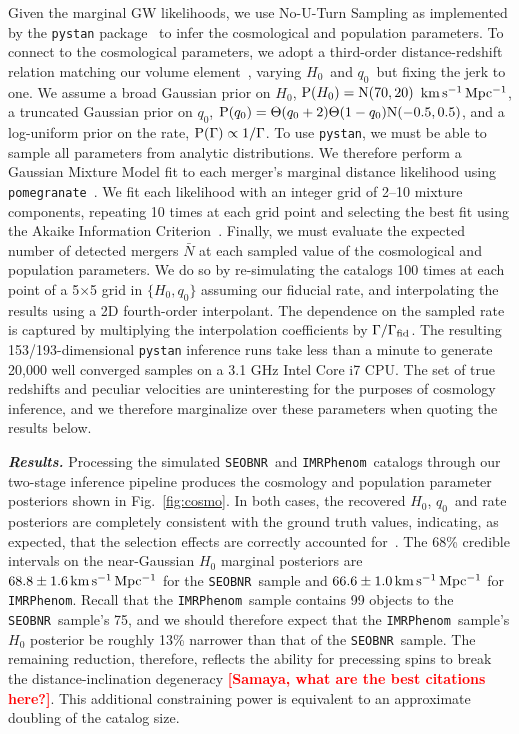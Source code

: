 \documentclass[%
 reprint,
 superscriptaddress,
 nofootinbib,
 amsmath,amssymb,
 aps,
]{revtex4-2}
\newcommand{\hubble}{\ensuremath{H_0}}
\newcommand{\decel}{\ensuremath{q_0}}
\newcommand{\prob}{\ensuremath{{\rm P}}}
\newcommand{\normal}{{\rm{N}}}
\newcommand{\nexp}{\bar{N}}
\newcommand{\rate}{\Gamma}
\newcommand{\step}{\Theta}
\newcommand{\kmsmpc}{\ensuremath{{\rm km\,s^{-1}\,Mpc^{-1}}}}
\newcommand{\seobnr}{\texttt{SEOBNR}}
\newcommand{\imrp}{\texttt{IMRPhenom}}
\newcommand{\smf}[1]{\textcolor{red}{\bf [#1]}}
\begin{document}
Given the marginal GW likelihoods, we use No-U-Turn Sampling as implemented by the \texttt{pystan} package~\cite{pystan} to infer the cosmological and population parameters. To connect to the cosmological parameters, we adopt a third-order distance-redshift relation matching our volume element~\cite{Visser:2004}, varying \hubble\ and \decel\ but fixing the jerk to one. We assume a broad Gaussian prior on \hubble, $\prob(\hubble)=\normal(70,20)$ \kmsmpc, a truncated Gaussian prior on \decel, $\prob(\decel)=\step(\decel+2)\step(1-\decel)\normal(-0.5,0.5)$, and a log-uniform prior on the rate, $\prob(\rate) \propto 1/\rate$. To use \texttt{pystan}, we must be able to sample all parameters from analytic distributions. We therefore perform a Gaussian Mixture Model fit to each merger's marginal distance likelihood using \texttt{pomegranate}~\cite{Schreiber:2017}. We fit each likelihood with an integer grid of 2--10 mixture components, repeating 10 times at each grid point and selecting the best fit using the Akaike Information Criterion~\cite{Akaike:1974}. Finally, we must evaluate the expected number of detected mergers $\nexp$ at each sampled value of the cosmological and population parameters. We do so by re-simulating the catalogs 100 times at each point of a 5$\times$5 grid in $\{H_0,q_0\}$ assuming our fiducial rate, and interpolating the results using a 2D fourth-order interpolant. The dependence on the sampled rate is captured by multiplying the interpolation coefficients by $\Gamma/\Gamma_{\rm fid}$. The resulting 153/193-dimensional \texttt{pystan} inference runs take less than a minute to generate 20,000 well converged samples on a 3.1 GHz Intel Core i7 CPU. The set of true redshifts and peculiar velocities are uninteresting for the purposes of cosmology inference, and we therefore marginalize over these parameters when quoting the results below.


\textbf{\emph{Results.}} Processing the simulated \seobnr\ and \imrp\ catalogs through our two-stage inference pipeline produces the cosmology and population parameter posteriors shown in Fig.~\ref{fig:cosmo}. In both cases, the recovered \hubble, \decel\ and rate posteriors are completely consistent with the ground truth values, indicating, as expected, that the selection effects are correctly accounted for~\cite{Mortlock_etal:2019}. The 68\% credible intervals on the near-Gaussian $\hubble$ marginal posteriors are $68.8 \pm 1.6\,\kmsmpc$ for the \seobnr\ sample and $66.6 \pm 1.0\,\kmsmpc$ for \imrp. Recall that the \imrp\ sample contains 99 objects to the \seobnr\ sample's 75, and we should therefore expect that the \imrp\ sample's $\hubble$ posterior be roughly 13\% narrower than that of the \seobnr\ sample. The remaining reduction, therefore, reflects the ability for precessing spins to break the distance-inclination degeneracy \smf{Samaya, what are the best citations here?}. This additional constraining power is equivalent to an approximate doubling of the catalog size.
\end{document}
